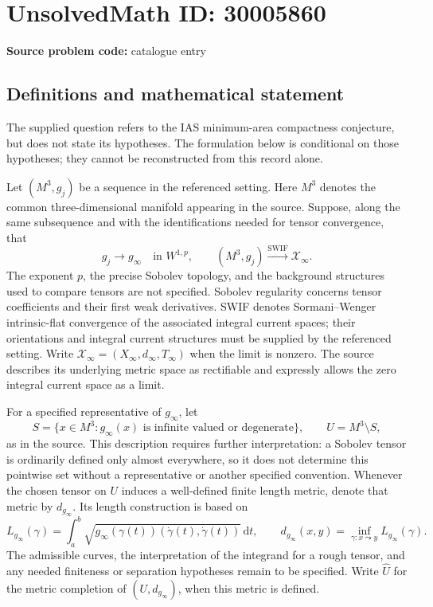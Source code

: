 \documentclass[11pt]{article}
\begin{document}
\section*{UnsolvedMath ID: 30005860}
\textbf{Source problem code:} catalogue entry
\subsection{Definitions and mathematical statement}
The supplied question refers to the IAS minimum-area compactness conjecture, but does not state its hypotheses. The formulation below is conditional on those hypotheses; they cannot be reconstructed from this record alone.

Let \((M^3,g_j)\) be a sequence in the referenced setting. Here \(M^3\) denotes the common three-dimensional manifold appearing in the source. Suppose, along the same subsequence and with the identifications needed for tensor convergence, that
\[
 g_j\longrightarrow g_\infty\quad\text{in }W^{1,p},
 \qquad
 (M^3,g_j)\xrightarrow{\mathrm{SWIF}}\mathcal X_\infty.
\]
The exponent \(p\), the precise Sobolev topology, and the background structures used to compare tensors are not specified. Sobolev regularity concerns tensor coefficients and their first weak derivatives. SWIF denotes Sormani--Wenger intrinsic-flat convergence of the associated integral current spaces; their orientations and integral current structures must be supplied by the referenced setting. Write \(\mathcal X_\infty=(X_\infty,d_\infty,T_\infty)\) when the limit is nonzero. The source describes its underlying metric space as rectifiable and expressly allows the zero integral current space as a limit.

For a specified representative of \(g_\infty\), let
\[
 S=\{x\in M^3:g_\infty(x)\text{ is infinite valued or degenerate}\},
 \qquad U=M^3\setminus S,
\]
as in the source. This description requires further interpretation: a Sobolev tensor is ordinarily defined only almost everywhere, so it does not determine this pointwise set without a representative or another specified convention. Whenever the chosen tensor on \(U\) induces a well-defined finite length metric, denote that metric by \(d_{g_\infty}\). Its length construction is based on
\[
 L_{g_\infty}(\gamma)
 =\int_a^b\sqrt{g_\infty(\gamma(t))(\dot\gamma(t),\dot\gamma(t))}\,\mathrm dt,
 \qquad
 d_{g_\infty}(x,y)=\inf_{\gamma:x\leadsto y}L_{g_\infty}(\gamma).
\]
The admissible curves, the interpretation of the integrand for a rough tensor, and any needed finiteness or separation hypotheses remain to be specified. Write \(\widehat U\) for the metric completion of \((U,d_{g_\infty})\), when this metric is defined.
\end{document}
